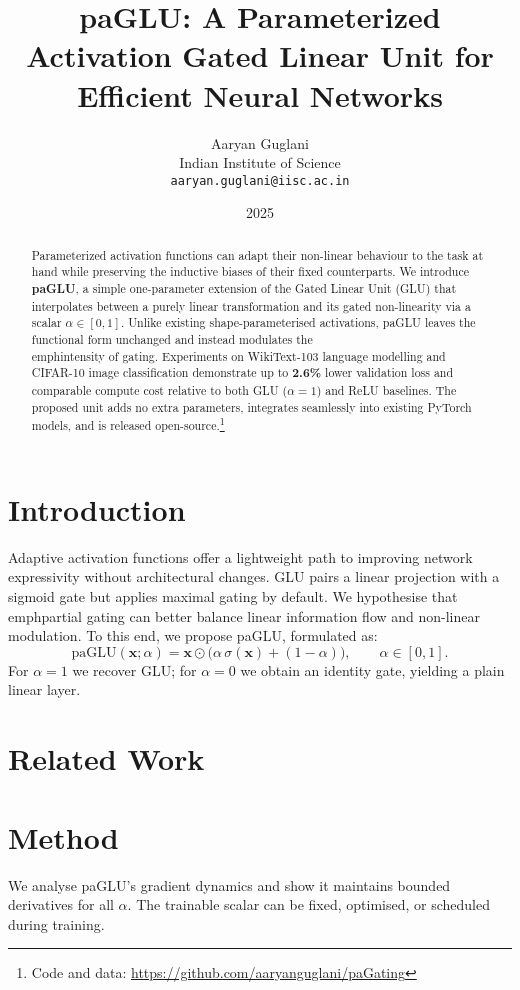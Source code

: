\documentclass[11pt]{article}
\title{paGLU: A Parameterized Activation Gated Linear Unit for Efficient Neural Networks}
\author{Aaryan Guglani \\ Indian Institute of Science\\\texttt{aaryan.guglani@iisc.ac.in}}
\date{2025}
\begin{document}
\maketitle
\begin{abstract}
Parameterized activation functions can adapt their non-linear behaviour to the task at hand while preserving the inductive biases of their fixed counterparts.  We introduce \textbf{paGLU}, a simple one-parameter extension of the Gated Linear Unit (GLU) that interpolates between a purely linear transformation and its gated non-linearity via a scalar $\alpha\in[0,1]$.  Unlike existing shape-parameterised activations, paGLU leaves the functional form unchanged and instead modulates the \\emph{intensity} of gating.  Experiments on WikiText-103 language modelling and CIFAR-10 image classification demonstrate up to \textbf{2.6\%} lower validation loss and comparable compute cost relative to both GLU ($\alpha=1$) and ReLU baselines.  The proposed unit adds no extra parameters, integrates seamlessly into existing PyTorch models, and is released open-source.\footnote{Code and data: \url{https://github.com/aaryanguglani/paGating}}
\end{abstract}

\section{Introduction}
\label{sec:intro}
Adaptive activation functions offer a lightweight path to improving network expressivity without architectural changes.  GLU \cite{dauphin2017language} pairs a linear projection with a sigmoid gate but applies maximal gating by default.  We hypothesise that \\emph{partial} gating can better balance linear information flow and non-linear modulation.  To this end, we propose paGLU, formulated as:
\begin{equation}
    \text{paGLU}(\mathbf{x};\alpha)=\mathbf{x}\odot\big(\alpha\,\sigma(\mathbf{x})+(1-\alpha)\big), \qquad \alpha\in[0,1].
\end{equation}
For $\alpha=1$ we recover GLU; for $\alpha=0$ we obtain an identity gate, yielding a plain linear layer.

\section{Related Work}


\section{Method}
\label{sec:method}
We analyse paGLU's gradient dynamics and show it maintains bounded derivatives for all $\alpha$.  The trainable scalar can be fixed, optimised, or scheduled during training.
\end{document}
